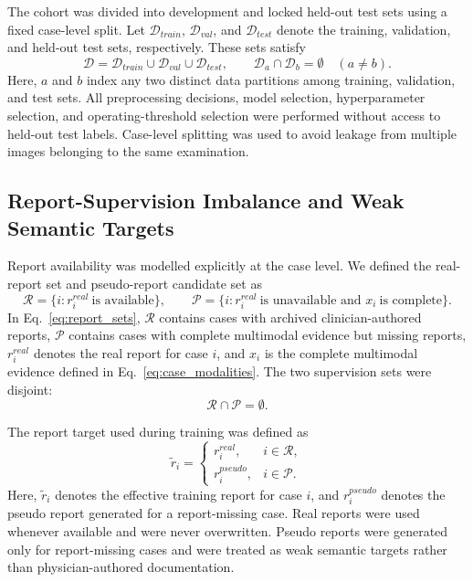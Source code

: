 The cohort was divided into development and locked held-out test sets using a fixed case-level split. Let \(\mathcal{D}_{train}\), \(\mathcal{D}_{val}\), and \(\mathcal{D}_{test}\) denote the training, validation, and held-out test sets, respectively. These sets satisfy
\begin{equation}
\mathcal{D}=\mathcal{D}_{train}\cup\mathcal{D}_{val}\cup\mathcal{D}_{test},
\qquad
\mathcal{D}_{a}\cap\mathcal{D}_{b}=\emptyset\quad(a\neq b).
\label{eq:data_split}
\end{equation}
Here, \(a\) and \(b\) index any two distinct data partitions among training, validation, and test sets. All preprocessing decisions, model selection, hyperparameter selection, and operating-threshold selection were performed without access to held-out test labels. Case-level splitting was used to avoid leakage from multiple images belonging to the same examination.

\subsection{Report-Supervision Imbalance and Weak Semantic Targets}
\label{subsec:methods_report_imbalance}

Report availability was modelled explicitly at the case level. We defined the real-report set and pseudo-report candidate set as
\begin{equation}
\mathcal{R}=\{i:r_i^{real}\ \text{is available}\},
\qquad
\mathcal{P}=\{i:r_i^{real}\ \text{is unavailable and }x_i\ \text{is complete}\}.
\label{eq:report_sets}
\end{equation}
In Eq.~\eqref{eq:report_sets}, \(\mathcal{R}\) contains cases with archived clinician-authored reports, \(\mathcal{P}\) contains cases with complete multimodal evidence but missing reports, \(r_i^{real}\) denotes the real report for case \(i\), and \(x_i\) is the complete multimodal evidence defined in Eq.~\eqref{eq:case_modalities}. The two supervision sets were disjoint:
\begin{equation}
\mathcal{R}\cap\mathcal{P}=\emptyset .
\label{eq:report_sets_disjoint}
\end{equation}

The report target used during training was defined as
\begin{equation}
\tilde{r}_i=
\begin{cases}
r_i^{real}, & i\in\mathcal{R},\\
r_i^{pseudo}, & i\in\mathcal{P}.
\end{cases}
\label{eq:training_report}
\end{equation}
Here, \(\tilde{r}_i\) denotes the effective training report for case \(i\), and \(r_i^{pseudo}\) denotes the pseudo report generated for a report-missing case. Real reports were used whenever available and were never overwritten. Pseudo reports were generated only for report-missing cases and were treated as weak semantic targets rather than physician-authored documentation.

